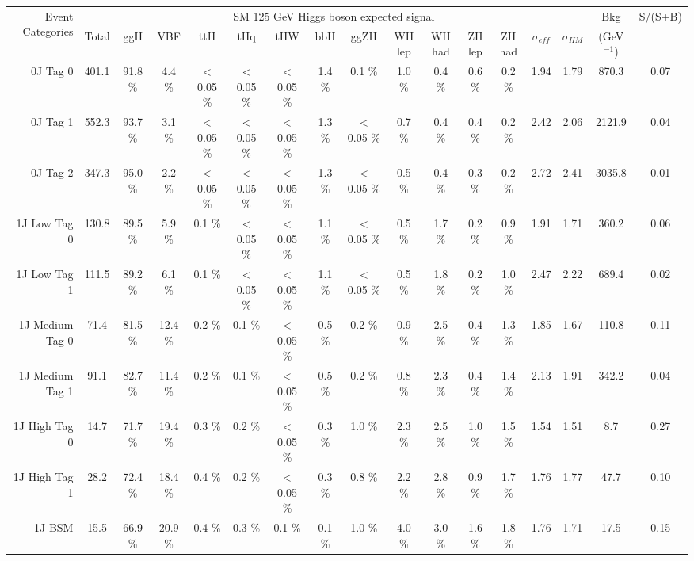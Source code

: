 \begin{tabular}{ r | c | c | c  | c | c |  c |  c |  c |  c |  c |  c |  c |  c |  c |  c |  c }
\hline
\multirow{2}{*}{Event Categories} &\multicolumn{14}{|c|}{SM 125 GeV Higgs boson expected signal} & Bkg & S/(S+B) \\ \cline{2-15}
  &  Total & ggH & VBF & ttH & tHq & tHW & bbH & ggZH & WH lep & WH had & ZH lep & ZH had &   $\sigma_{eff} $  & $\sigma_{HM} $ & (GeV$^{-1}$) & \\ 
\hline
 0J Tag 0 &  401.1  &  91.8 \%  &  4.4 \%  &  $<$0.05 \%  &  $<$0.05 \%  &  $<$0.05 \%  &  1.4 \%  &  0.1 \%  &  1.0 \%  &  0.4 \%  &  0.6 \%  &  0.2 \%  & 1.94 & 1.79 & 870.3 & 0.07 \\
 0J Tag 1 &  552.3  &  93.7 \%  &  3.1 \%  &  $<$0.05 \%  &  $<$0.05 \%  &  $<$0.05 \%  &  1.3 \%  &  $<$0.05 \%  &  0.7 \%  &  0.4 \%  &  0.4 \%  &  0.2 \%  & 2.42 & 2.06 & 2121.9 & 0.04 \\
 0J Tag 2 &  347.3  &  95.0 \%  &  2.2 \%  &  $<$0.05 \%  &  $<$0.05 \%  &  $<$0.05 \%  &  1.3 \%  &  $<$0.05 \%  &  0.5 \%  &  0.4 \%  &  0.3 \%  &  0.2 \%  & 2.72 & 2.41 & 3035.8 & 0.01 \\
 1J Low Tag 0 &  130.8  &  89.5 \%  &  5.9 \%  &  0.1 \%  &  $<$0.05 \%  &  $<$0.05 \%  &  1.1 \%  &  $<$0.05 \%  &  0.5 \%  &  1.7 \%  &  0.2 \%  &  0.9 \%  & 1.91 & 1.71 & 360.2 & 0.06 \\
 1J Low Tag 1 &  111.5  &  89.2 \%  &  6.1 \%  &  0.1 \%  &  $<$0.05 \%  &  $<$0.05 \%  &  1.1 \%  &  $<$0.05 \%  &  0.5 \%  &  1.8 \%  &  0.2 \%  &  1.0 \%  & 2.47 & 2.22 & 689.4 & 0.02 \\
 1J Medium Tag 0 &  71.4  &  81.5 \%  &  12.4 \%  &  0.2 \%  &  0.1 \%  &  $<$0.05 \%  &  0.5 \%  &  0.2 \%  &  0.9 \%  &  2.5 \%  &  0.4 \%  &  1.3 \%  & 1.85 & 1.67 & 110.8 & 0.11 \\
 1J Medium Tag 1 &  91.1  &  82.7 \%  &  11.4 \%  &  0.2 \%  &  0.1 \%  &  $<$0.05 \%  &  0.5 \%  &  0.2 \%  &  0.8 \%  &  2.3 \%  &  0.4 \%  &  1.4 \%  & 2.13 & 1.91 & 342.2 & 0.04 \\
 1J High Tag 0 &  14.7  &  71.7 \%  &  19.4 \%  &  0.3 \%  &  0.2 \%  &  $<$0.05 \%  &  0.3 \%  &  1.0 \%  &  2.3 \%  &  2.5 \%  &  1.0 \%  &  1.5 \%  & 1.54 & 1.51 & 8.7 & 0.27 \\
 1J High Tag 1 &  28.2  &  72.4 \%  &  18.4 \%  &  0.4 \%  &  0.2 \%  &  $<$0.05 \%  &  0.3 \%  &  0.8 \%  &  2.2 \%  &  2.8 \%  &  0.9 \%  &  1.7 \%  & 1.76 & 1.77 & 47.7 & 0.10 \\
 1J BSM &  15.5  &  66.9 \%  &  20.9 \%  &  0.4 \%  &  0.3 \%  &  0.1 \%  &  0.1 \%  &  1.0 \%  &  4.0 \%  &  3.0 \%  &  1.6 \%  &  1.8 \%  & 1.76 & 1.71 & 17.5 & 0.15 \\

\end{tabular}
